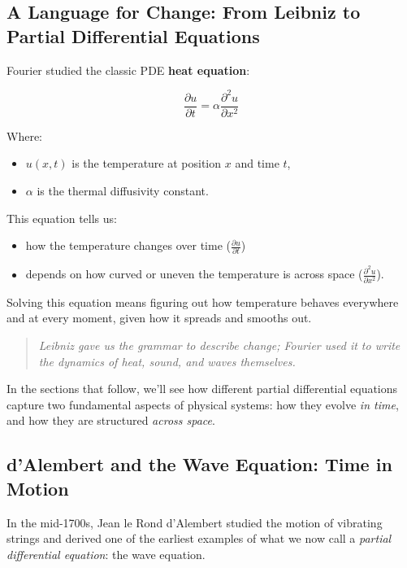 \subsection{A Language for Change: From Leibniz to Partial Differential Equations}

Fourier studied the classic PDE \textbf{heat equation}:

\[
\frac{\partial u}{\partial t} = \alpha \frac{\partial^2 u}{\partial x^2}
\]

Where:
\begin{itemize}
  \item \( u(x, t) \) is the temperature at position \( x \) and time \( t \),
  \item \( \alpha \) is the thermal diffusivity constant.
\end{itemize}

This equation tells us:  
\begin{itemize}
  \item how the temperature changes over time (\( \frac{\partial u}{\partial t} \))  
  \item depends on how curved or uneven the temperature is across space (\( \frac{\partial^2 u}{\partial x^2} \)).  
\end{itemize}

Solving this equation means figuring out how temperature behaves everywhere and at every moment, given how it spreads and smooths out.

\begin{quote}
\textit{Leibniz gave us the grammar to describe change; Fourier used it to write the dynamics of heat, sound, and waves themselves.}
\end{quote}

In the sections that follow, we’ll see how different partial differential equations capture two fundamental aspects of physical systems: how they evolve \emph{in time}, and how they are structured \emph{across space}.



\subsection{d’Alembert and the Wave Equation: Time in Motion}

In the mid-1700s, Jean le Rond d’Alembert studied the motion of vibrating strings and derived one of the earliest examples of what we now call a \textit{partial differential equation}: the wave equation.

